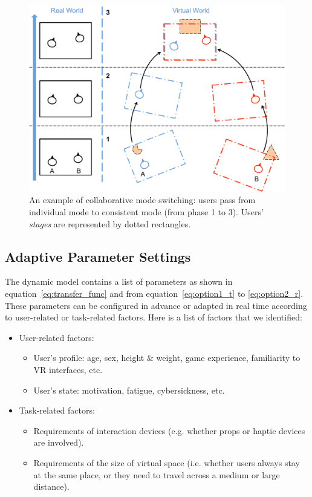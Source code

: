 \begin{figure}[htb]
  \centering
  \includegraphics[width=.9\textwidth]{figures/ch5/mode_switch}
  \caption{\label{fig:5_mode_switch}An example of collaborative mode switching: users pass from individual mode to consistent mode (from phase 1 to 3). Users' \textit{stages} are represented by dotted rectangles.}
\end{figure}

\subsection{Adaptive Parameter Settings}
\label{sec:para_set}

The dynamic model contains a list of parameters as shown in equation~\ref{eq:transfer_func} and from equation~\ref{eq:option1_t} to \ref{eq:option2_r}. These parameters can be configured in advance or adapted in real time according to user-related or task-related factors. Here is a list of factors that we identified:

\begin{itemize}
\item User-related factors:
  \begin{itemize}
    \item User's profile: age, sex, height \& weight, game experience, familiarity to VR interfaces, etc.
    \item User's state: motivation, fatigue, cybersickness, etc.
  \end{itemize}
\item Task-related factors:
  \begin{itemize}
    \item Requirements of interaction devices (e.g. whether props or haptic devices are involved).
    \item Requirements of the size of virtual space (i.e. whether users always stay at the same place, or they need to travel across a medium or large distance).
  \end{itemize}
\end{itemize}

